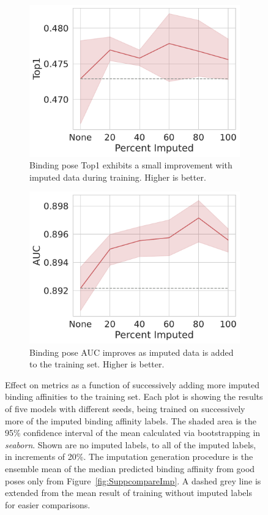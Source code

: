 \documentclass[journal=jcisd8,manuscript=article]{achemso}
\begin{document}
\begin{figure}[tbph]
    \begin{subfigure}[t]{0.48\textwidth}
        \centering
        \includegraphics[width=\linewidth]{figures/MedGOEns_addingImpTop1.pdf}
        \caption{Binding pose Top1 exhibits a small improvement with imputed data during training. Higher is better.}
    \end{subfigure}
    \hfill
    \begin{subfigure}[t]{0.48\textwidth}
        \centering
        \includegraphics[width=\linewidth]{figures/MedGOEns_addingImpAUC.pdf}
        \caption{Binding pose AUC improves as imputed data is added to the training set. Higher is better.}
    \end{subfigure}
    \caption{Effect on metrics as a function of successively adding more imputed binding affinities to the training set. Each plot is showing the results of five models with different seeds, being trained on successively more of the imputed binding affinity labels. The shaded area is the 95\% confidence interval of the mean calculated via bootstrapping in \textit{seaborn}. Shown are no imputed labels, to all of the imputed labels, in increments of 20\%. The imputation generation procedure is the ensemble mean of the median predicted binding affinity from good poses only from Figure~\ref{fig:SuppcompareImp}. A dashed grey line is extended from the mean result of training without imputed labels for easier comparisons.}
    \label{fig:SuppmedGOEnsAdding}
\end{figure}
\end{document}
